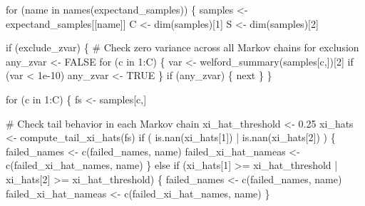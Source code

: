 \documentclass[
  letterpaper,
  DIV=11,
  numbers=noendperiod]{scrartcl}
\newenvironment{Shaded}{\begin{snugshade}}{\end{snugshade}}
\newcommand{\CommentTok}[1]{\textcolor[rgb]{0.37,0.37,0.37}{#1}}
\newcommand{\ConstantTok}[1]{\textcolor[rgb]{0.56,0.35,0.01}{#1}}
\newcommand{\ControlFlowTok}[1]{\textcolor[rgb]{0.00,0.23,0.31}{#1}}
\newcommand{\DecValTok}[1]{\textcolor[rgb]{0.68,0.00,0.00}{#1}}
\newcommand{\FloatTok}[1]{\textcolor[rgb]{0.68,0.00,0.00}{#1}}
\newcommand{\FunctionTok}[1]{\textcolor[rgb]{0.28,0.35,0.67}{#1}}
\newcommand{\NormalTok}[1]{\textcolor[rgb]{0.00,0.23,0.31}{#1}}
\newcommand{\OtherTok}[1]{\textcolor[rgb]{0.00,0.23,0.31}{#1}}
\newcommand{\SpecialCharTok}[1]{\textcolor[rgb]{0.37,0.37,0.37}{#1}}
\begin{document}
\begin{Shaded}
\begin{Highlighting}[]
  \ControlFlowTok{for}\NormalTok{ (name }\ControlFlowTok{in} \FunctionTok{names}\NormalTok{(expectand\_samples)) \{}
\NormalTok{    samples }\OtherTok{\textless{}{-}}\NormalTok{ expectand\_samples[[name]]}
\NormalTok{    C }\OtherTok{\textless{}{-}} \FunctionTok{dim}\NormalTok{(samples)[}\DecValTok{1}\NormalTok{]}
\NormalTok{    S }\OtherTok{\textless{}{-}} \FunctionTok{dim}\NormalTok{(samples)[}\DecValTok{2}\NormalTok{]}
    
    \ControlFlowTok{if}\NormalTok{ (exclude\_zvar) \{}
      \CommentTok{\# Check zero variance across all Markov chains for exclusion}
\NormalTok{      any\_zvar }\OtherTok{\textless{}{-}} \ConstantTok{FALSE}
      \ControlFlowTok{for}\NormalTok{ (c }\ControlFlowTok{in} \DecValTok{1}\SpecialCharTok{:}\NormalTok{C) \{}
\NormalTok{        var }\OtherTok{\textless{}{-}} \FunctionTok{welford\_summary}\NormalTok{(samples[c,])[}\DecValTok{2}\NormalTok{]}
        \ControlFlowTok{if}\NormalTok{ (var }\SpecialCharTok{\textless{}} \FloatTok{1e{-}10}\NormalTok{)}
\NormalTok{          any\_zvar }\OtherTok{\textless{}{-}} \ConstantTok{TRUE}
\NormalTok{      \}}
      \ControlFlowTok{if}\NormalTok{ (any\_zvar) \{}
        \ControlFlowTok{next}
\NormalTok{      \}}
\NormalTok{    \}}

    \ControlFlowTok{for}\NormalTok{ (c }\ControlFlowTok{in} \DecValTok{1}\SpecialCharTok{:}\NormalTok{C) \{}
\NormalTok{      fs }\OtherTok{\textless{}{-}}\NormalTok{ samples[c,]}
      
      \CommentTok{\# Check tail behavior in each Markov chain}
\NormalTok{      xi\_hat\_threshold }\OtherTok{\textless{}{-}} \FloatTok{0.25}
\NormalTok{      xi\_hats }\OtherTok{\textless{}{-}} \FunctionTok{compute\_tail\_xi\_hats}\NormalTok{(fs)}
      \ControlFlowTok{if}\NormalTok{ ( }\FunctionTok{is.nan}\NormalTok{(xi\_hats[}\DecValTok{1}\NormalTok{]) }\SpecialCharTok{|} \FunctionTok{is.nan}\NormalTok{(xi\_hats[}\DecValTok{2}\NormalTok{]) ) \{}
\NormalTok{        failed\_names }\OtherTok{\textless{}{-}} \FunctionTok{c}\NormalTok{(failed\_names, name)}
\NormalTok{        failed\_xi\_hat\_nameas }\OtherTok{\textless{}{-}} \FunctionTok{c}\NormalTok{(failed\_xi\_hat\_names, name)}
\NormalTok{      \} }\ControlFlowTok{else} \ControlFlowTok{if}\NormalTok{ (xi\_hats[}\DecValTok{1}\NormalTok{] }\SpecialCharTok{\textgreater{}=}\NormalTok{ xi\_hat\_threshold }\SpecialCharTok{|} 
\NormalTok{                 xi\_hats[}\DecValTok{2}\NormalTok{] }\SpecialCharTok{\textgreater{}=}\NormalTok{ xi\_hat\_threshold) \{}
\NormalTok{        failed\_names }\OtherTok{\textless{}{-}} \FunctionTok{c}\NormalTok{(failed\_names, name)}
\NormalTok{        failed\_xi\_hat\_nameas }\OtherTok{\textless{}{-}} \FunctionTok{c}\NormalTok{(failed\_xi\_hat\_names, name)}
\NormalTok{      \}}
      

\end{Highlighting}
\end{Shaded}
\end{document}
